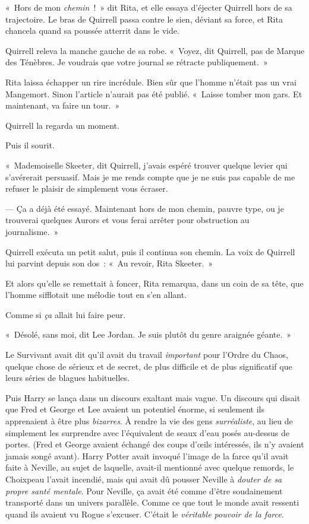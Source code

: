 «~Hors de mon \emph{chemin}~!~» dit Rita, et elle essaya d'éjecter Quirrell hors de sa trajectoire. Le bras de Quirrell passa contre le sien, déviant sa force, et Rita chancela quand sa poussée atterrit dans le vide.

Quirrell releva la manche gauche de sa robe. «~Voyez, dit Quirrell, pas de Marque des Ténèbres. Je voudrais que votre journal se rétracte publiquement.~»

Rita laissa échapper un rire incrédule. Bien sûr que l'homme n'était pas un vrai Mangemort. Sinon l'article n'aurait pas été publié. «~Laisse tomber mon gars. Et maintenant, va faire un tour.~»

Quirrell la regarda un moment.

Puis il sourit.

«~Mademoiselle Skeeter, dit Quirrell, j'avais espéré trouver quelque levier qui s'avérerait persuasif. Mais je me rends compte que je ne suis pas capable de me refuser le plaisir de simplement vous écraser.

--- Ça a déjà été essayé. Maintenant hors de mon chemin, pauvre type, ou je trouverai quelques Aurors et vous ferai arrêter pour obstruction au journalisme.~»

Quirrell exécuta un petit salut, puis il continua son chemin. La voix de Quirrell lui parvint depuis son dos~: «~Au revoir, Rita Skeeter.~»

Et alors qu'elle se remettait à foncer, Rita remarqua, dans un coin de sa tête, que l'homme sifflotait une mélodie tout en s'en allant.

Comme si \emph{ça} allait lui faire peur.


«~Désolé, sans moi, dit Lee Jordan. Je suis plutôt du genre araignée géante.~»

Le Survivant avait dit qu'il avait du travail \emph{important} pour l'Ordre du Chaos, quelque chose de sérieux et de secret, de plus difficile et de plus significatif que leurs séries de blagues habituelles.

Puis Harry se lança dans un discours exaltant mais vague. Un discours qui disait que Fred et George et Lee avaient un potentiel énorme, si seulement ils apprenaient à être plus \emph{bizarres}. À rendre la vie des gens \emph{surréaliste}, au lieu de simplement les surprendre avec l'équivalent de seaux d'eau posés au-dessus de portes. (Fred et George avaient échangé des coups d'œils intéressés, ils n'y avaient jamais songé avant). Harry Potter avait invoqué l'image de la farce qu'il avait faite à Neville, au sujet de laquelle, avait-il mentionné avec quelque remords, le Choixpeau l'avait incendié, mais qui avait dû pousser Neville à \emph{douter de sa propre santé mentale}. Pour Neville, ça avait été comme d'être soudainement transporté dans un univers parallèle. Comme ce que tout le monde avait ressenti quand ils avaient vu Rogue s'excuser. C'était le \emph{véritable pouvoir de la farce}.

